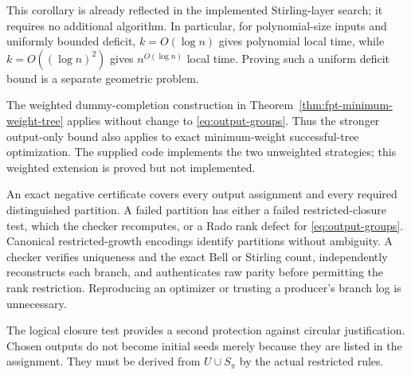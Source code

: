 This corollary is already reflected in the implemented Stirling-layer
search; it requires no additional algorithm. In particular, for
polynomial-size inputs and uniformly bounded deficit, $k=O(\log n)$
gives polynomial local time, while $k=O((\log n)^2)$ gives
$n^{O(\log n)}$ local time. Proving such a uniform deficit bound is a
separate geometric problem.

The weighted dummy-completion construction in
Theorem~\ref{thm:fpt-minimum-weight-tree} applies without change to
\eqref{eq:output-groups}. Thus the stronger output-only bound also applies
to exact minimum-weight successful-tree optimization. The supplied code
implements the two unweighted strategies; this weighted extension is
proved but not implemented.

An exact negative certificate covers every output assignment and every
required distinguished partition. A failed partition has either a failed
restricted-closure test, which the checker recomputes, or a Rado rank
defect for \eqref{eq:output-groups}. Canonical restricted-growth encodings
identify partitions without ambiguity. A checker verifies uniqueness and
the exact Bell or Stirling count, independently reconstructs each branch,
and authenticates raw parity before permitting the rank restriction.
Reproducing an optimizer or trusting a producer's branch log is unnecessary.

The logical closure test provides a second protection against circular
justification. Chosen outputs do not become initial seeds merely because
they are listed in the assignment. They must be derived from $U\cup S_\pi$
by the actual restricted rules.
